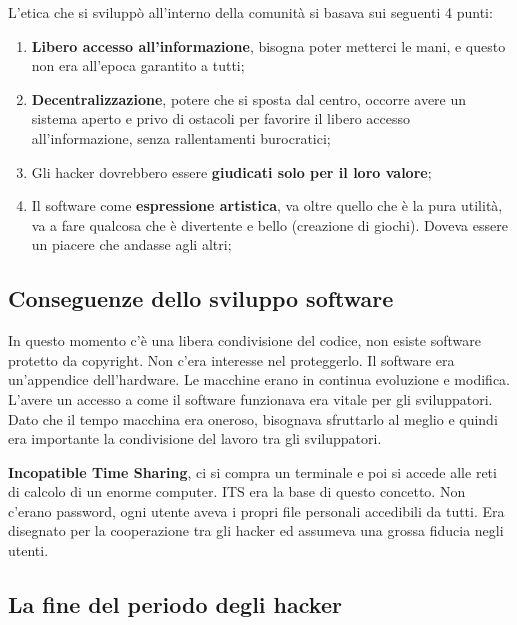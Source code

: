 L'etica che si sviluppò all'interno della comunità si basava sui seguenti 4 punti:

\begin{enumerate}

\item \textbf{Libero accesso all'informazione}, bisogna poter metterci le mani, e questo non era all'epoca garantito a tutti;
\item \textbf{Decentralizzazione}, potere che si sposta dal centro, occorre avere un sistema aperto e privo di ostacoli per favorire il libero accesso all'informazione, senza rallentamenti burocratici;
\item Gli hacker dovrebbero essere \textbf{giudicati solo per il loro valore};
\item Il software come \textbf{espressione artistica}, va oltre quello che è la pura utilità, va a fare qualcosa che è divertente e bello (creazione di giochi). Doveva essere un piacere che andasse agli altri;

\end{enumerate}

\subsection{Conseguenze dello sviluppo software}

In questo momento c'è una libera condivisione del codice, non esiste software protetto da copyright. Non c'era interesse nel proteggerlo. Il software era un'appendice dell'hardware. Le macchine erano in continua evoluzione e modifica. L'avere un accesso a come il software funzionava era vitale per gli sviluppatori. Dato che il tempo macchina era oneroso, bisognava sfruttarlo al meglio e quindi era importante la condivisione del lavoro tra gli sviluppatori.

\textbf{Incopatible Time Sharing}, ci si compra un terminale e poi si accede alle reti di calcolo di un enorme computer. ITS era la base di questo concetto. Non c'erano password, ogni utente aveva i propri file personali accedibili da tutti. Era disegnato per la cooperazione tra gli hacker ed assumeva una grossa fiducia negli utenti.

\subsection{La fine del periodo degli hacker}

